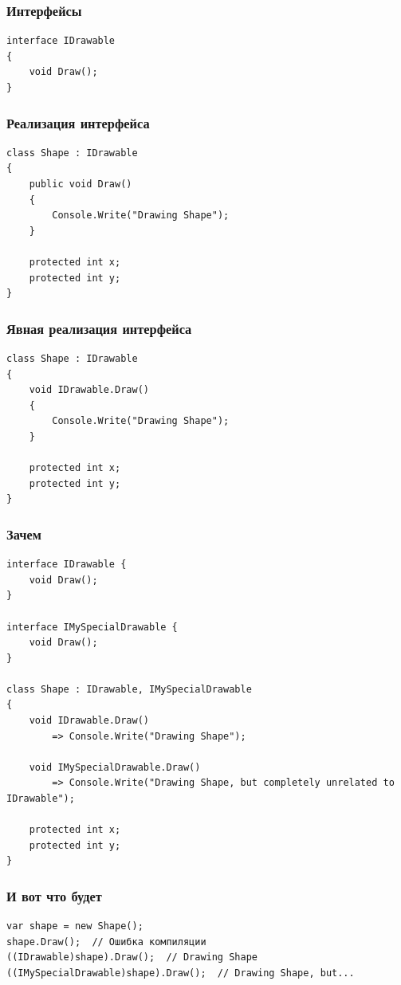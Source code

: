 \documentclass{../../slides-style}
\begin{document}
    \begin{frame}[fragile]
        \frametitle{Интерфейсы}
        \begin{verbatim}
interface IDrawable
{
    void Draw();
}
        \end{verbatim}
    \end{frame}

    \begin{frame}[fragile]
        \frametitle{Реализация интерфейса}
        \begin{verbatim}
class Shape : IDrawable
{
    public void Draw()
    {
        Console.Write("Drawing Shape");
    }

    protected int x;
    protected int y;
}
        \end{verbatim}
    \end{frame}

    \begin{frame}[fragile]
        \frametitle{Явная реализация интерфейса}
        \begin{verbatim}
class Shape : IDrawable
{
    void IDrawable.Draw()
    {
        Console.Write("Drawing Shape");
    }

    protected int x;
    protected int y;
}
        \end{verbatim}
    \end{frame}

    \begin{frame}[fragile]
        \frametitle{Зачем}
        \begin{footnotesize}
            \begin{verbatim}
interface IDrawable {
    void Draw();
}

interface IMySpecialDrawable {
    void Draw();
}

class Shape : IDrawable, IMySpecialDrawable
{
    void IDrawable.Draw()
        => Console.Write("Drawing Shape");

    void IMySpecialDrawable.Draw()
        => Console.Write("Drawing Shape, but completely unrelated to IDrawable");

    protected int x;
    protected int y;
}
            \end{verbatim}
        \end{footnotesize}
    \end{frame}

    \begin{frame}[fragile]
        \frametitle{И вот что будет}
        \begin{verbatim}
var shape = new Shape();
shape.Draw();  // Ошибка компиляции
((IDrawable)shape).Draw();  // Drawing Shape
((IMySpecialDrawable)shape).Draw();  // Drawing Shape, but...
        \end{verbatim}
    \end{frame}
\end{document}
